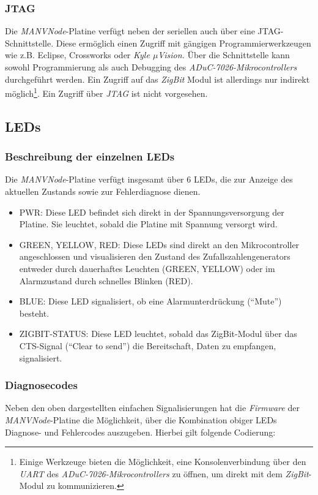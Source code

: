 \subsubsection{JTAG}
Die \emph{MANVNode}-Platine verfügt neben der seriellen auch über eine JTAG-Schnittstelle. Diese ermöglich einen Zugriff mit
gängigen Programmierwerkzeugen wie z.B. Eclipse, Crossworks oder \emph{Kyle $\mu{}$Vision.}
Über die Schnittstelle kann sowohl Programmierung als auch Debugging des \emph{ADuC-7026-Mikrocontrollers}
durchgeführt werden. Ein Zugriff auf das \emph{ZigBit} Modul ist allerdings nur indirekt 
möglich\footnote{Einige Werkzeuge bieten die Möglichkeit, eine Konsolenverbindung
über den \emph{UART} des \emph{ADuC-7026-Mikrocontrollers} zu öffnen, um direkt mit dem \emph{ZigBit}-Modul zu
    kommunizieren.}.  Ein Zugriff über \emph{JTAG} ist nicht vorgesehen.

\subsection{LEDs}

\subsubsection{Beschreibung der einzelnen LEDs}
Die \emph{MANVNode}-Platine verfügt insgesamt über 6 LEDs, die zur Anzeige des aktuellen Zustands sowie zur Fehlerdiagnose dienen.
\begin{itemize}
    \item{PWR:} Diese LED befindet sich direkt in der Spannungsversorgung der Platine. Sie leuchtet, sobald
                die Platine mit Spannung versorgt wird. 
    \item{GREEN, YELLOW, RED}: Diese LEDs sind direkt an den Mikrocontroller angeschlossen und visualisieren den Zustand des
                               Zufallszahlengenerators entweder durch dauerhaftes Leuchten (GREEN, YELLOW) oder im Alarmzustand
                               durch schnelles Blinken (RED). 
    \item{BLUE}: Diese LED signalisiert, ob eine Alarmunterdrückung ("`Mute"') besteht.
    \item{ZIGBIT-STATUS}: Diese LED leuchtet, sobald das ZigBit-Modul über das CTS-Signal ("`Clear to send"') die Bereitschaft, 
                          Daten zu empfangen, signalisiert.
\end{itemize}
                 
    

\subsubsection{Diagnosecodes}
Neben den oben dargestellten einfachen Signalisierungen hat die \emph{Firmware} der \emph{MANVNode}-Platine die 
Möglichkeit, über die Kombination obiger LEDs Diagnose- und Fehlercodes auszugeben. Hierbei gilt folgende Codierung:

